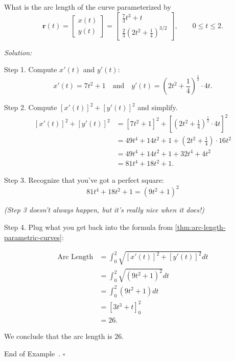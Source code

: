 \documentclass[10pt]{article}
\theoremstyle{definition}
\newtheorem{example}[theorem]{Example}
\renewenvironment{example}
{\begin{oldexample}}
  {\par\smallskip\hfill   End of Example~\theexample. $\square$    \par\end{oldexample}}
\newcommand{\1}[1]{\textbf{1}_{\left[#1\right]}} %
\begin{document}
\begin{example}[Arc length]
  What is the arc length of the curve parameterized by 
  \begin{equation*}
    \mathbf{r}(t) =
    \begin{bmatrix}
      x(t)\\y(t)
    \end{bmatrix}
    =
    \begin{bmatrix}
      \frac{7}{3}t^{3}+t\\\frac{2}{3}\left( 2t^{2}+\frac{1}{4} \right)^{3/2}
    \end{bmatrix}, \qquad 0 \leq t \leq 2.
  \end{equation*}
  
  \noindent \textit{Solution:}

  Step 1. Compute $x'(t)$ and $y'(t)$:
  \begin{equation*}
    x'(t) = 7t^{2}+1
    \quad \text{and} \quad 
    y'(t) = \left(2t^{2}+\frac{1}{4}\right)^{\frac{1}{2}}\cdot 4t.
  \end{equation*}

  Step 2. Compute $\left[ x'(t) \right]^{2}+\left[ y'(t) \right]^{2}$ and simplify.
  \begin{align*}
    \left[ x'(t) \right]^{2}+\left[ y'(t) \right]^{2} 
    &=\left[ 7t^{2}+1 \right]^{2} + \left[ \left( 2t^{2}+\frac{1}{4} \right)^{\frac{1}{2}}\cdot 4t  \right]^{2}\\  
    &= 49 t^{4} + 14 t^{2}+1 + \left( 2t^{2}+\frac{1}{4} \right)\cdot 16t^{2}\\ 
    &= 49t^{4}+ 14 t^{2} + 1 + 32 t^{4}+ 4 t^{2}\\
    &= 81 t^{4}+ 18 t^{2}+1.
  \end{align*}

  Step 3. Recognize that you've got a perfect square:
  \begin{equation*}
    81 t^{4}+ 18 t^{2}+1 = \left( 9t^{2}+1 \right)^{2}
  \end{equation*}

  \quad \textit{(Step 3 doesn't always happen, but it's \textit{really} nice when it does!)}
  

  Step 4. Plug what you get back into the formula from \cref{thm:arc-length-parametric-curves}:

  \begin{align*}
    \text{Arc Length} 
    &= \int_{0}^{2}  \sqrt{\left[ x'(t) \right]^{2} + \left[ y'(t) \right]^{2}  } dt\\
    &= \int_{0}^{2} \sqrt{ \left( 9t^{2}+1 \right)^{2} }dt\\ 
    &= \int_{0}^{2}  (9t^{2}+1) dt\\
    &= \left[ 3t^{3} + t \right]^{2}_{0}\\ 
    &= 26.
  \end{align*}
  
  We conclude that the arc length is 26.
\end{example}
\end{document}

